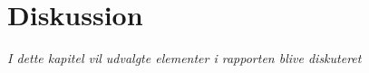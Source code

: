 \chapter{Diskussion}\label{kap:diskussion}
\emph{I dette kapitel vil udvalgte elementer i rapporten blive diskuteret}